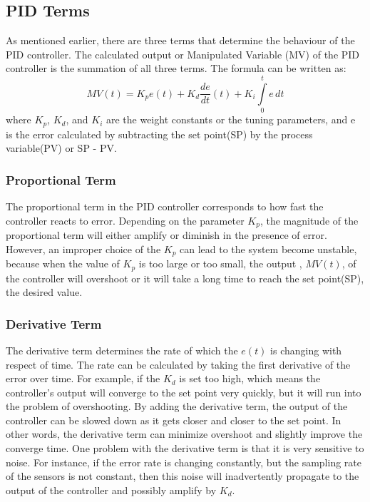 \subsection{PID Terms}
As mentioned earlier, there are three terms that determine the behaviour of the
PID controller. The calculated output or Manipulated Variable (MV) of the PID
controller is the summation of all three terms. The formula can be written as:
\begin{displaymath}
MV(t) = K_pe(t) + K_d\frac{de}{dt}(t) + K_i\int\limits_{0}^{t} e\, dt
\end{displaymath}
where $K_p$, $K_d$, and $K_i$ are the weight constants or the tuning parameters,
and e is the error calculated by subtracting the set point(SP) by the process
variable(PV) or SP - PV.

\subsubsection{Proportional Term}
The proportional term in the PID controller corresponds to how fast the
controller reacts to error. Depending on the parameter $K_p$, the magnitude of
the proportional term will either amplify or diminish in the presence of error.
However, an improper choice of the $K_p$ can lead to the system become unstable,
because when the value of $K_p$ is too large or too small, the output , $MV(t)$,
of the controller will overshoot or it will take a long time to reach the set
point(SP), the desired value. 

\subsubsection{Derivative Term}
The derivative term determines the rate of which the $e(t)$ is changing with
respect of time. The rate can be calculated by taking the first derivative of
the error over time. For example, if the $K_d$ is set too high, which means the
controller's output will converge to the set point very quickly, but it will run
into the problem of overshooting. By adding the derivative term, the output of
the controller can be slowed down as it gets closer and closer to the set point.
In other words, the derivative term can minimize overshoot and slightly improve
the converge time. One problem with the derivative term is that it is very
sensitive to noise. For instance, if the error rate is changing constantly, but
the sampling rate of the sensors is not constant, then this noise will
inadvertently propagate to the output of the controller and possibly amplify by
$K_d$. 

